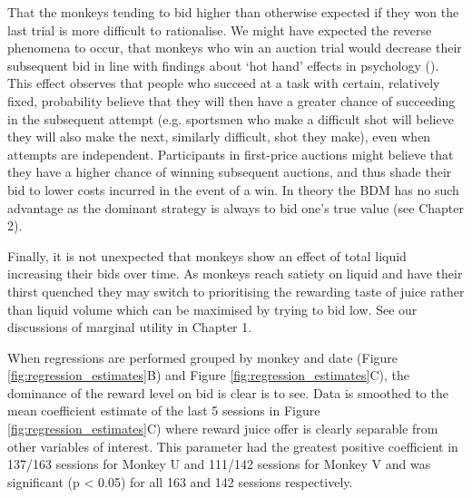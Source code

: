 That the monkeys tending to bid higher than otherwise expected if they won the last trial is more difficult to rationalise. We might have expected the reverse phenomena to occur, that monkeys who win an auction trial would decrease their subsequent bid in line with findings about ‘hot hand’ effects in psychology (\cite{gilovichHotHandBasketball1985}). This effect observes that people who succeed at a task with certain, relatively fixed, probability believe that they will then have a greater chance of succeeding in the subsequent attempt (e.g. sportsmen who make a difficult shot will believe they will also make the next, similarly difficult, shot they make), even when attempts are independent. Participants in first-price auctions might believe that they have a higher chance of winning subsequent auctions, and thus shade their bid to lower costs incurred in the event of a win. In theory the BDM has no such advantage as the dominant strategy is always to bid one’s true value (see Chapter 2).

Finally, it is not unexpected that monkeys show an effect of total liquid increasing their bids over time. As monkeys reach satiety on liquid and have their thirst quenched they may switch to prioritising the rewarding taste of juice rather than liquid volume which can be maximised by trying to bid low. See our discussions of marginal utility in Chapter 1.

When regressions are performed grouped by monkey and date (Figure \ref{fig:regression_estimates}B) and Figure \ref{fig:regression_estimates}C), the dominance of the reward level on bid is clear is to see. Data is smoothed to the mean coefficient estimate of the last 5 sessions in Figure \ref{fig:regression_estimates}C) where reward juice offer is clearly separable from other variables of interest. This parameter had the greatest positive coefficient in 137/163 sessions for Monkey U and 111/142 sessions for Monkey V and was significant (p < 0.05) for all 163 and 142 sessions respectively.


